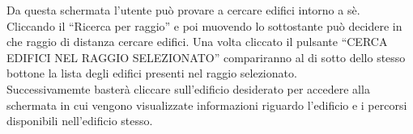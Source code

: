 Da questa schermata l'utente può provare a cercare edifici intorno a sè. \\ Cliccando il  ``Ricerca per raggio'' e poi muovendo lo  sottostante può decidere in che raggio di distanza cercare edifici. Una volta cliccato il pulsante ``CERCA EDIFICI NEL RAGGIO SELEZIONATO'' compariranno al di sotto dello stesso bottone la lista degli edifici presenti nel raggio selezionato. \\ 
Successivamemte basterà cliccare sull'edificio desiderato per accedere alla schermata in cui vengono visualizzate informazioni riguardo l'edificio e i percorsi disponibili nell'edificio stesso.
